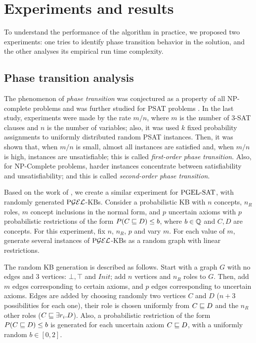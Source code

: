 
\chapter{Experiments and results}
\label{cap:experiments}

To understand the performance of the algorithm in practice, we proposed two experiments: one tries to identify phase transition behavior in the solution, and the other analyses its empirical run time complexity.

\section{Phase transition analysis}
\label{sec:phase-trans}

The phenomenon of \emph{phase transition} was conjectured as a property of all NP-complete problems \citep{cheeseman1991really} and was further studied for PSAT problems \citep{Finger2011ProbabilisticSL}. In the last study, experiments were made by the rate $m/n$, where $m$ is the number of 3-SAT clauses and $n$ is the number of variables; also, it was used $k$ fixed probability assignments to uniformly distributed random PSAT instances. Then, it was shown that, when $m/n$ is small, almost all instances are satisfied and, when $m/n$ is high, instances are unsatisfiable; this is called \emph{first-order phase transition}. Also, for NP-Complete problems, harder instances concentrate between satisfiability and unsatisfiability; and this is called \emph{second-order phase transition}.

Based on the work of \citeauthor{Finger2011ProbabilisticSL}, we create a similar experiment for $\text{PGEL-SAT}$, with randomly generated $\text{P}\mathcal{GEL}$-KBs. Consider a probabilistic KB with $n$ concepts, $n_R$ roles, $m$ concept inclusions in the normal form, and $p$ uncertain axioms with $p$ probabilistic restrictions of the form $P(C \sqsubseteq D) \leq b$, where $b \in \mathbb{Q}$ and $C, D$ are concepts. For this experiment, fix $n$, $n_R$, $p$ and vary $m$. For each value of $m$, generate several instances of $\text{P}\mathcal{GEL}$-KBs as a random graph with linear restrictions.

The random KB generation is described as follows. Start with a graph $G$ with no edges and 3 vertices: $\bot, \top$ and $Init$; add $n$ vertices and $n_R$ roles to $G$. Then, add $m$ edges corresponding to certain axioms, and $p$ edges corresponding to uncertain axioms. Edges are added by choosing randomly two vertices $C$ and $D$ ($n+3$ possibilities for each one), their role is chosen uniformly from $C \sqsubseteq D$ and the $n_R$ other roles ($C \sqsubseteq \exists r_i.D$). Also, a probabilistic restriction of the form $P(C \sqsubseteq D) \leq b$ is generated for each uncertain axiom $C \sqsubseteq D$, with a uniformly random $b \in [0, 2]$.

